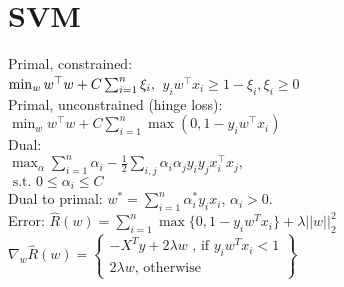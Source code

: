 \section{SVM}
Primal, constrained:\\
$\min_{w} w^\top w + C \sum_{i=1}^{n} \xi_i,\\$ $ y_i w^\top x_i \geq 1 - \xi_i, \xi_i \geq 0$\\
Primal, unconstrained (hinge loss):\\
$\min_{w} w^\top w + C \sum_{i=1}^{n} \max(0, 1-y_i w^\top x_i)$\\
Dual:\\
$\max_{\alpha} \sum_{i=1}^{n} \alpha_i - \frac{1}{2} \sum_{i,j} \alpha_i \alpha_j y_i y_j x_i^\top x_j,$\\$ \text{ s.t. } 0 \leq \alpha_i \leq C$\\
Dual to primal: $w^* = \sum_{i=1}^{n} \alpha^*_i y_i x_i$, $\alpha_i > 0$.\\
Error: $\hat{R}(w) = \sum_{i=1}^n \max \{0,1-y_i w^T x_i\} + \lambda ||w||_2^2$\\
$\nabla_w \hat{R}(w) = \left\{
\begin{array}{lr}
-X^Ty + 2\lambda w \text{ , if }y_iw^Tx_i<1\\
2\lambda w \text{, otherwise}
\end{array}\right\}$








